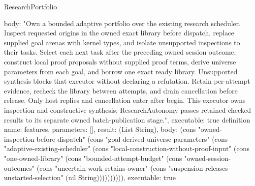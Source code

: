 \begin{lexlean}{ResearchPortfolio}
\begin{semanticmodule}
{ body: "Own a bounded adaptive portfolio over the existing research scheduler. Inspect requested origins in the owned exact library before dispatch, replace supplied goal arenas with kernel types, and isolate unsupported inspections to their tasks. Select each next task after the preceding owned session outcome, construct local proof proposals without supplied proof terms, derive universe parameters from each goal, and borrow one exact ready library. Unsupported synthesis blocks that executor without declaring a refutation. Retain per-attempt evidence, recheck the library between attempts, and drain cancellation before release. Only host replies and cancellation enter after begin. This executor owns inspection and constructive synthesis; ResearchAutonomy passes retained checked results to its separate owned batch-publication stage.",
 executable: true
}
definition{
 name: features,
 parameters: [],
 result: (List String),
 body: (cons "owned-inspection-before-dispatch" (cons "goal-derived-universe-parameters" (cons "adaptive-existing-scheduler" (cons "local-construction-without-proof-input" (cons "one-owned-library" (cons "bounded-attempt-budget" (cons "owned-session-outcomes" (cons "uncertain-work-retains-owner" (cons "suspension-releases-unstarted-selection" (nil String)))))))))),
 executable: true
}
\end{semanticmodule}
\end{lexlean}

